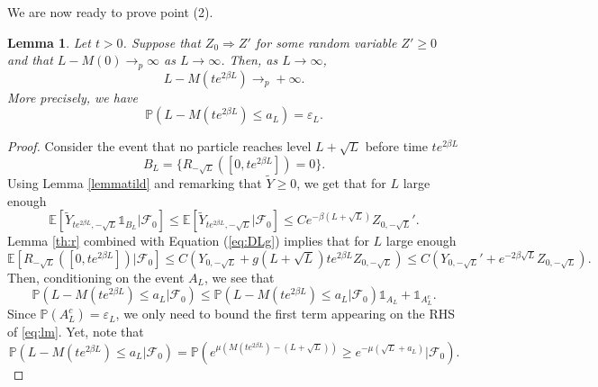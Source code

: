 \documentclass[11pt]{article}
\theoremstyle{plain}
\newtheorem{lemma}{Lemma}[section]
\newcommand\vep{\varepsilon}
\begin{document}
We are now ready to prove point (2).
\begin{lemma}\label{lem:max}
Let $t>0$. Suppose that $Z_0\Rightarrow Z'$ for some random variable $Z'\geqslant 0$ and that $L-M(0)\to_p\infty$ as $L\to\infty$. Then, as $L\to \infty$,
\begin{equation*}
L-M(te^{2\beta L})\to_p+\infty.
\end{equation*}
More precisely, we have 
\begin{equation*}
\mathbb{P}\left(L-M(te^{2\beta L})\leqslant a_L\right)=\vep_L.
\end{equation*}
\end{lemma}
\begin{proof} 
Consider the event that no particle reaches level $L+\sqrt{L}$ before time $te^{2\beta L}$ \begin{equation*}
B_L=\{R_{-\sqrt{L}}([0,te^{2\beta L}])=0\}.
\end{equation*}
Using Lemma \ref{lemmatild} and remarking that $\tilde{Y}\geqslant 0$, we get that  for $L$ large enough
\begin{equation}
\mathbb{E}\left[\tilde{Y}_{te^{2\beta L},{-\sqrt{L}}}\mathbb{1}_{B_L}|\mathcal{F}_0\right]\leqslant\mathbb{E}\left[\tilde{Y}_{te^{2\beta L},{-\sqrt{L}}}|\mathcal{F}_0\right]\leqslant Ce^{-\beta (L+\sqrt{L})}Z_{0,-\sqrt{L}}'.\label{eq:EYtildeL}
\end{equation}
Lemma \ref{th:r} combined with Equation (\ref{eq:DLg}) implies that for $L$ large enough
\begin{equation}
\mathbb{E}\left[R_{-\sqrt{L}}([0,te^{2\beta L}])|\mathcal{F}_0\right]\leqslant C\left(Y_{0,-\sqrt{L}}+g(L+\sqrt{L})te^{2\beta L}Z_{0,-\sqrt{L}}\right)\leqslant C\left(Y_{0,-\sqrt{L}}'+ e^{-2\beta \sqrt{L}}Z_{0,-\sqrt{L}}\right).\label{eq:ERL}
\end{equation}
Then, conditioning on the event $A_L$, we see that
\begin{equation}
\mathbb{P}\left(L-M(te^{2\beta L})\leqslant a_L|\mathcal{F}_0\right)\leqslant
\mathbb{P}\left(L-M(te^{2\beta L})\leqslant a_L|\mathcal{F}_0\right)\mathbb{1}_{A_L}+\mathbb{1}_{A_L^c}. \label{eq:lm}
\end{equation}
Since $\mathbb{P}(A_L^c)=\vep_L$, we only need to bound the first term appearing on the RHS of \eqref{eq:lm}. Yet, note that 
\begin{equation*}
\mathbb{P}\left(L-M(te^{2\beta L})\leqslant a_L|\mathcal{F}_0\right)=\mathbb{P}\left(e^{\mu(M(te^{2\beta L})-(L+\sqrt{L}))}\geqslant e^{-\mu (\sqrt{L}+a_L)}|\mathcal{F}_0\right).
\end{equation*}

\end{proof}
\end{document}
